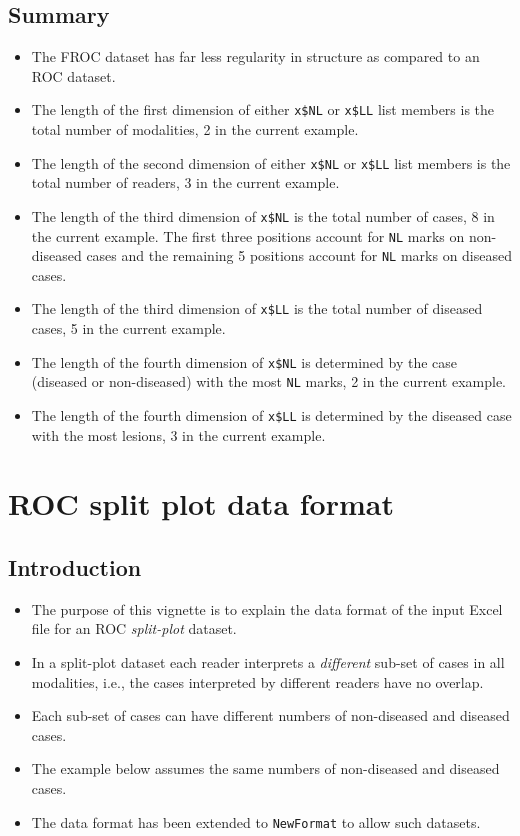 \documentclass[]{book}
\providecommand{\tightlist}{%
  \setlength{\itemsep}{0pt}\setlength{\parskip}{0pt}}
\begin{document}
\hypertarget{summary}{%
\section{Summary}\label{summary}}

\begin{itemize}
\tightlist
\item
  The FROC dataset has far less regularity in structure as compared to an ROC dataset.
\item
  The length of the first dimension of either \texttt{x\$NL} or \texttt{x\$LL} list members is the total number of modalities, 2 in the current example.
\item
  The length of the second dimension of either \texttt{x\$NL} or \texttt{x\$LL} list members is the total number of readers, 3 in the current example.
\item
  The length of the third dimension of \texttt{x\$NL} is the total number of cases, 8 in the current example. The first three positions account for \texttt{NL} marks on non-diseased cases and the remaining 5 positions account for \texttt{NL} marks on diseased cases.
\item
  The length of the third dimension of \texttt{x\$LL} is the total number of diseased cases, 5 in the current example.
\item
  The length of the fourth dimension of \texttt{x\$NL} is determined by the case (diseased or non-diseased) with the most \texttt{NL} marks, 2 in the current example.
\item
  The length of the fourth dimension of \texttt{x\$LL} is determined by the diseased case with the most lesions, 3 in the current example.
\end{itemize}

\hypertarget{rocSpdataformat}{%
\chapter{ROC split plot data format}\label{rocSpdataformat}}

\hypertarget{introduction-2}{%
\section{Introduction}\label{introduction-2}}

\begin{itemize}
\tightlist
\item
  The purpose of this vignette is to explain the data format of the input Excel file for an ROC \emph{split-plot} dataset.
\item
  In a split-plot dataset each reader interprets a \emph{different} sub-set of cases in all modalities, i.e., the cases interpreted by different readers have no overlap.
\item
  Each sub-set of cases can have different numbers of non-diseased and diseased cases.
\item
  The example below assumes the same numbers of non-diseased and diseased cases.
\item
  The data format has been extended to \texttt{NewFormat} to allow such datasets.
\end{itemize}
\end{document}
